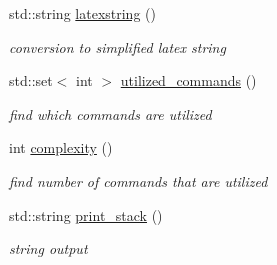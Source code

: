 \begin{DoxyCompactItemize}
\item 
std\+::string \hyperlink{classAcyclicGraph_a9534cfd26946835e4190bfa722856f56}{latexstring} ()
\begin{DoxyCompactList}\small\item\em conversion to simplified latex string \end{DoxyCompactList}\item 
std\+::set$<$ int $>$ \hyperlink{classAcyclicGraph_a9be943e53aa4257ca1ba960868e2a3da}{utilized\+\_\+commands} ()
\begin{DoxyCompactList}\small\item\em find which commands are utilized \end{DoxyCompactList}\item 
int \hyperlink{classAcyclicGraph_a66f52b6e177fdef6f9578e400d8efe93}{complexity} ()
\begin{DoxyCompactList}\small\item\em find number of commands that are utilized \end{DoxyCompactList}\item 
std\+::string \hyperlink{classAcyclicGraph_abea4470f8df7e67cca412973a2b7bb17}{print\+\_\+stack} ()
\begin{DoxyCompactList}\small\item\em string output \end{DoxyCompactList}\end{DoxyCompactItemize}
